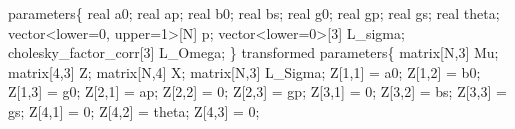\documentclass[
  12pt,
  letterpaper,
  DIV=11,
  numbers=noendperiod]{scrartcl}
\newenvironment{Shaded}{\begin{snugshade}}{\end{snugshade}}
\newcommand{\DataTypeTok}[1]{\textcolor[rgb]{0.68,0.00,0.00}{#1}}
\newcommand{\DecValTok}[1]{\textcolor[rgb]{0.68,0.00,0.00}{#1}}
\newcommand{\KeywordTok}[1]{\textcolor[rgb]{0.00,0.23,0.31}{#1}}
\newcommand{\NormalTok}[1]{\textcolor[rgb]{0.00,0.23,0.31}{#1}}
\begin{document}
\begin{Shaded}
\begin{Highlighting}[]
\KeywordTok{parameters}\NormalTok{\{}
  \DataTypeTok{real}\NormalTok{ a0;}
  \DataTypeTok{real}\NormalTok{ ap;}
  \DataTypeTok{real}\NormalTok{ b0;}
  \DataTypeTok{real}\NormalTok{ bs;}
  \DataTypeTok{real}\NormalTok{ g0;}
  \DataTypeTok{real}\NormalTok{ gp;}
  \DataTypeTok{real}\NormalTok{ gs;}
  \DataTypeTok{real}\NormalTok{ theta;}
  \DataTypeTok{vector}\NormalTok{\textless{}}\KeywordTok{lower}\NormalTok{=}\DecValTok{0}\NormalTok{, }\KeywordTok{upper}\NormalTok{=}\DecValTok{1}\NormalTok{\textgreater{}[N] p;}
  \DataTypeTok{vector}\NormalTok{\textless{}}\KeywordTok{lower}\NormalTok{=}\DecValTok{0}\NormalTok{\textgreater{}[}\DecValTok{3}\NormalTok{] L\_sigma;}
  \DataTypeTok{cholesky\_factor\_corr}\NormalTok{[}\DecValTok{3}\NormalTok{] L\_Omega;}
\NormalTok{\}}
\KeywordTok{transformed parameters}\NormalTok{\{}
  \DataTypeTok{matrix}\NormalTok{[N,}\DecValTok{3}\NormalTok{] Mu;}
  \DataTypeTok{matrix}\NormalTok{[}\DecValTok{4}\NormalTok{,}\DecValTok{3}\NormalTok{] Z;}
  \DataTypeTok{matrix}\NormalTok{[N,}\DecValTok{4}\NormalTok{] X;}
  \DataTypeTok{matrix}\NormalTok{[N,}\DecValTok{3}\NormalTok{] L\_Sigma;}
\NormalTok{  Z[}\DecValTok{1}\NormalTok{,}\DecValTok{1}\NormalTok{] = a0;}
\NormalTok{  Z[}\DecValTok{1}\NormalTok{,}\DecValTok{2}\NormalTok{] = b0;}
\NormalTok{  Z[}\DecValTok{1}\NormalTok{,}\DecValTok{3}\NormalTok{] = g0;}
\NormalTok{  Z[}\DecValTok{2}\NormalTok{,}\DecValTok{1}\NormalTok{] = ap;}
\NormalTok{  Z[}\DecValTok{2}\NormalTok{,}\DecValTok{2}\NormalTok{] = }\DecValTok{0}\NormalTok{;}
\NormalTok{  Z[}\DecValTok{2}\NormalTok{,}\DecValTok{3}\NormalTok{] = gp;}
\NormalTok{  Z[}\DecValTok{3}\NormalTok{,}\DecValTok{1}\NormalTok{] = }\DecValTok{0}\NormalTok{;}
\NormalTok{  Z[}\DecValTok{3}\NormalTok{,}\DecValTok{2}\NormalTok{] = bs;}
\NormalTok{  Z[}\DecValTok{3}\NormalTok{,}\DecValTok{3}\NormalTok{] = gs;}
\NormalTok{  Z[}\DecValTok{4}\NormalTok{,}\DecValTok{1}\NormalTok{] = }\DecValTok{0}\NormalTok{;}
\NormalTok{  Z[}\DecValTok{4}\NormalTok{,}\DecValTok{2}\NormalTok{] = theta;}
\NormalTok{  Z[}\DecValTok{4}\NormalTok{,}\DecValTok{3}\NormalTok{] = }\DecValTok{0}\NormalTok{;}


\end{Highlighting}
\end{Shaded}
\end{document}
